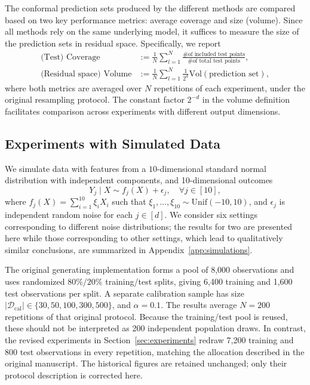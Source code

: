 The conformal prediction sets produced by the different methods are compared based on two key performance metrics: average coverage and size (volume). Since all methods rely on the same underlying model, it suffices to measure the size of the prediction sets in residual space. Specifically, we report
\begin{align*}
    \text{(Test) Coverage} &:= \frac{1}{N}\sum^N_{l=1} \frac{\text{\# of included test points}}{\text{\# of total test points}},\\
    \text{(Residual space) Volume} &:= \frac{1}{N}\sum^N_{l=1} \frac{1}{2^d} \text{Vol}(\text{prediction set}),
\end{align*}
where both metrics are averaged over $N$ repetitions of each experiment, under the original resampling protocol. The constant factor $2^{-d}$ in the volume definition facilitates comparison across experiments with different output dimensions.

\subsection{Experiments with Simulated Data}

We simulate data with features from a $10$-dimensional standard normal distribution with independent components, and 10-dimensional outcomes
\begin{equation}
    Y_j \mid X \sim f_j(X) + \epsilon_j, \quad \forall j \in [10],
    \label{eq:data-generator}
\end{equation}
where $f_j(X) = \sum^{10}_{i=1}\xi_i X_i$ such that $\xi_1,\ldots,\xi_{10} \sim \text{Unif}(-10, 10)$, and $\epsilon_j$ is independent random noise for each $j \in [d]$.
We consider six settings corresponding to different noise distributions; the results for two are presented here while those corresponding to other settings, which lead to qualitatively similar conclusions, are summarized in Appendix~\ref{app:simulations}.

{\color{blue}The original generating implementation forms a pool of 8,000
observations and uses randomized $80\%/20\%$ training/test splits, giving
6,400 training and 1,600 test observations per split. A separate calibration
sample has size $|\mathcal D_{\mathrm{cal}}|\in\{30,50,100,300,500\}$, and
$\alpha=0.1$. The results average $N=200$ repetitions of that original
protocol. Because the training/test pool is reused, these should not be
interpreted as 200 independent population draws. In contrast, the revised
experiments in Section~\ref{sec:experiments} redraw 7,200 training and 800
test observations in every repetition, matching the allocation described in
the original manuscript. The historical figures are retained unchanged;
only their protocol description is corrected here.}

